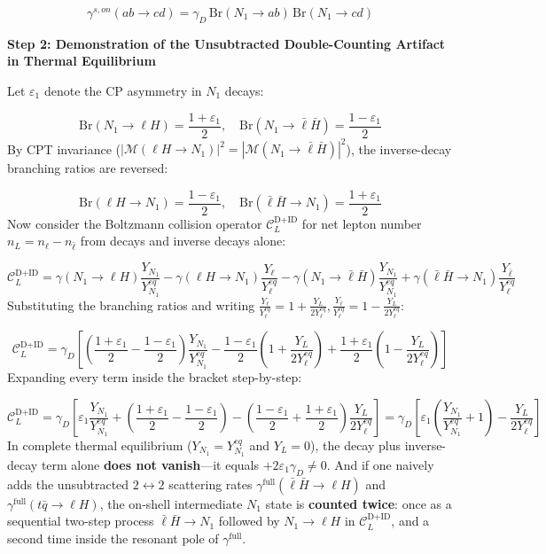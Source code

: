 \documentclass[aps,prd,onecolumn,superscriptaddress,nofootinbib,longbibliography,10pt]{revtex4-2}
\begin{document}
  \[ \gamma^{s,on}(ab \to cd) = \gamma_D\,\text{Br}(N_1 \to ab)\,\text{Br}(N_1 \to cd) \]

  \textbf{Step 2: Demonstration of the Unsubtracted Double-Counting Artifact in Thermal Equilibrium}


  Let \(\varepsilon_1\) denote the CP asymmetry in \(N_1\) decays:


  \[ \text{Br}(N_1 \to \ell H) = \frac{1 + \varepsilon_1}{2}, \quad \text{Br}(N_1 \to \bar{\ell}\bar{H}) = \frac{1 - \varepsilon_1}{2} \]
  By CPT invariance (\(|\mathcal{M}(\ell H \to N_1)|^2 = |\mathcal{M}(N_1 \to \bar{\ell}\bar{H})|^2\)), the inverse-decay branching ratios are reversed:


  \[ \text{Br}(\ell H \to N_1) = \frac{1 - \varepsilon_1}{2}, \quad \text{Br}(\bar{\ell}\bar{H} \to N_1) = \frac{1 + \varepsilon_1}{2} \]
  Now consider the Boltzmann collision operator \(\mathcal{C}_L^{\text{D+ID}}\) for net lepton number \(n_L = n_\ell - n_{\bar{\ell}}\) from decays and inverse decays alone:


  \[ \mathcal{C}_L^{\text{D+ID}} = \gamma(N_1 \to \ell H)\frac{Y_{N_1}}{Y_{N_1}^{eq}} - \gamma(\ell H \to N_1)\frac{Y_\ell}{Y_\ell^{eq}} - \gamma(N_1 \to \bar{\ell}\bar{H})\frac{Y_{N_1}}{Y_{N_1}^{eq}} + \gamma(\bar{\ell}\bar{H} \to N_1)\frac{Y_{\bar{\ell}}}{Y_\ell^{eq}} \]
  Substituting the branching ratios and writing \(\frac{Y_\ell}{Y_\ell^{eq}} = 1 + \frac{Y_L}{2Y_\ell^{eq}}, \frac{Y_{\bar{\ell}}}{Y_\ell^{eq}} = 1 - \frac{Y_L}{2Y_\ell^{eq}}\):


  \[ \mathcal{C}_L^{\text{D+ID}} = \gamma_D\left[ \left(\frac{1 + \varepsilon_1}{2} - \frac{1 - \varepsilon_1}{2}\right)\frac{Y_{N_1}}{Y_{N_1}^{eq}} - \frac{1 - \varepsilon_1}{2}\left(1 + \frac{Y_L}{2Y_\ell^{eq}}\right) + \frac{1 + \varepsilon_1}{2}\left(1 - \frac{Y_L}{2Y_\ell^{eq}}\right) \right] \]
  Expanding every term inside the bracket step-by-step:


  \[ \mathcal{C}_L^{\text{D+ID}} = \gamma_D\left[ \varepsilon_1\frac{Y_{N_1}}{Y_{N_1}^{eq}} + \left(\frac{1 + \varepsilon_1}{2} - \frac{1 - \varepsilon_1}{2}\right) - \left(\frac{1 - \varepsilon_1}{2} + \frac{1 + \varepsilon_1}{2}\right)\frac{Y_L}{2Y_\ell^{eq}} \right] = \gamma_D\left[ \varepsilon_1\left(\frac{Y_{N_1}}{Y_{N_1}^{eq}} + 1\right) - \frac{Y_L}{2Y_\ell^{eq}} \right] \]
  In complete thermal equilibrium (\(Y_{N_1} = Y_{N_1}^{eq}\) and \(Y_L = 0\)), the decay plus inverse-decay term alone \textbf{does not vanish}—it equals \(+2\varepsilon_1\gamma_D \neq 0\). And if one naively adds the unsubtracted \(2 \leftrightarrow 2\) scattering rates \(\gamma^{\text{full}}(\bar{\ell}\bar{H} \to \ell H)\) and \(\gamma^{\text{full}}(t\bar{q} \to \ell H)\), the on-shell intermediate \(N_1\) state is \textbf{counted twice}: once as a sequential two-step process \(\bar{\ell}\bar{H} \to N_1\) followed by \(N_1 \to \ell H\) in \(\mathcal{C}_L^{\text{D+ID}}\), and a second time inside the resonant pole of \(\gamma^{\text{full}}\).
\end{document}
